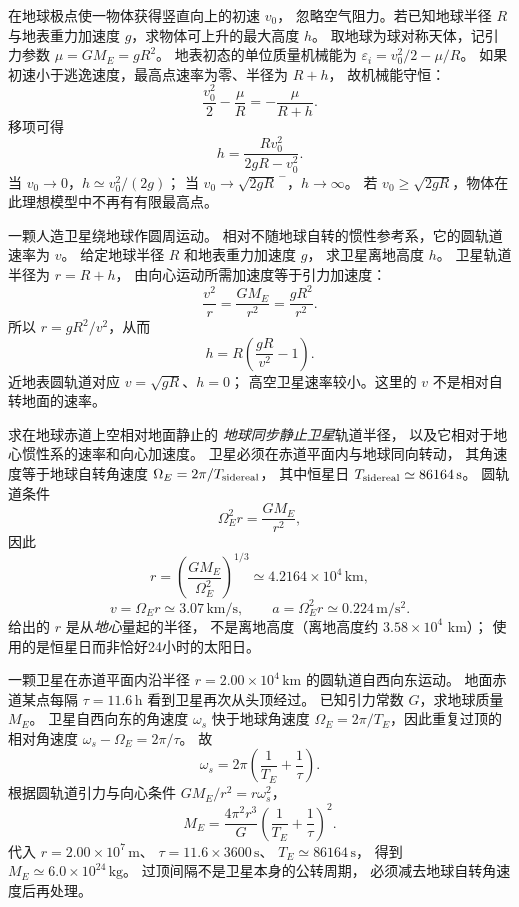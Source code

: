 在地球极点使一物体获得竖直向上的初速 $v_0$，
忽略空气阻力。若已知地球半径 $R$ 与地表重力加速度
$g$，求物体可上升的最大高度 $h$。
\exsolution
取地球为球对称天体，记引力参数
$\mu=GM_E=gR^2$。
地表初态的单位质量机械能为
$\varepsilon_i=v_0^2/2-\mu/R$。
如果初速小于逃逸速度，最高点速率为零、半径为 $R+h$，
故机械能守恒：
\[
\frac{v_0^2}{2}-\frac{\mu}{R}
=-\frac{\mu}{R+h}.
\]
移项可得
\[
\boxed{h=\frac{Rv_0^2}{2gR-v_0^2}}.
\]
\excheck 当 $v_0\to0$，$h\simeq v_0^2/(2g)$；
当 $v_0\to\sqrt{2gR}^{\,-}$，$h\to\infty$。
若 $v_0\ge\sqrt{2gR}$，物体在此理想模型中不再有有限最高点。

一颗人造卫星绕地球作圆周运动。
相对不随地球自转的惯性参考系，它的圆轨道速率为 $v$。
给定地球半径 $R$ 和地表重力加速度 $g$，
求卫星离地高度 $h$。
\exsolution
卫星轨道半径为 $r=R+h$，
由向心运动所需加速度等于引力加速度：
\[
\frac{v^2}{r}=\frac{GM_E}{r^2}
=\frac{gR^2}{r^2}.
\]
所以 $r=gR^2/v^2$，从而
\[
\boxed{h=R\left(\frac{gR}{v^2}-1\right)}.
\]
\excheck 近地表圆轨道对应 $v=\sqrt{gR}$、$h=0$；
高空卫星速率较小。这里的 $v$ 不是相对自转地面的速率。

求在地球赤道上空相对地面静止的
\emph{地球同步静止卫星}轨道半径，
以及它相对于地心惯性系的速率和向心加速度。
\exsolution
卫星必须在赤道平面内与地球同向转动，
其角速度等于地球自转角速度
$\Omega_E=2\pi/T_{\rm sidereal}$，
其中恒星日 $T_{\rm sidereal}\simeq86164\,\mathrm s$。
圆轨道条件
\[
\Omega_E^2r=\frac{GM_E}{r^2},
\]
因此
\[
\boxed{r=\left(\frac{GM_E}{\Omega_E^2}\right)^{1/3}
\simeq4.2164\times10^4\,\mathrm{km}},
\]
\[
\boxed{v=\Omega_Er\simeq3.07\,\mathrm{km/s}},\qquad
\boxed{a=\Omega_E^2r\simeq0.224\,\mathrm{m/s^2}}.
\]
\excheck 给出的 $r$ 是从\emph{地心}量起的半径，
不是离地高度（离地高度约 $3.58\times10^4$ km）；
使用的是恒星日而非恰好24小时的太阳日。

一颗卫星在赤道平面内沿半径
$r=2.00\times10^4\,\mathrm{km}$ 的圆轨道自西向东运动。
地面赤道某点每隔 $\tau=11.6\,\mathrm h$
看到卫星再次从头顶经过。
已知引力常数 $G$，求地球质量 $M_E$。
\exsolution
卫星自西向东的角速度 $\omega_s$ 快于地球角速度
$\Omega_E=2\pi/T_E$，因此重复过顶的相对角速度
$\omega_s-\Omega_E=2\pi/\tau$。
故
\[
\omega_s=2\pi\left(\frac1{T_E}+\frac1\tau\right).
\]
根据圆轨道引力与向心条件
$GM_E/r^2=r\omega_s^2$，
\[
\boxed{M_E=\frac{4\pi^2r^3}{G}
\left(\frac1{T_E}+\frac1\tau\right)^2}.
\]
代入 $r=2.00\times10^7\,\mathrm m$、
$\tau=11.6\times3600\,\mathrm s$、
$T_E\simeq86164\,\mathrm s$，
得到 $\boxed{M_E\simeq6.0\times10^{24}\,\mathrm{kg}}$。
\excheck 过顶间隔不是卫星本身的公转周期，
必须减去地球自转角速度后再处理。

